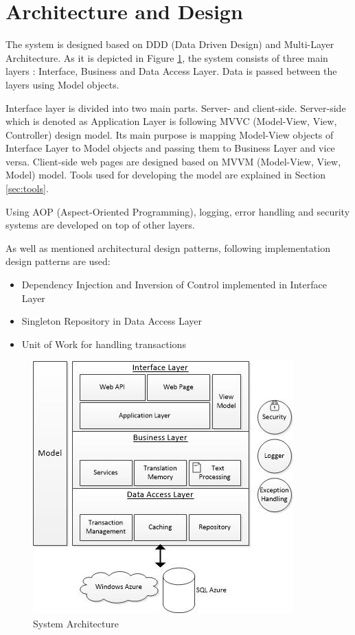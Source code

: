 \section{Architecture and Design}
\label{sec:architecture}
The system is designed based on DDD (Data Driven Design) and Multi-Layer Architecture. As it is depicted in Figure \ref{fig:architecture}, the system consists of three main layers : Interface, Business and Data Access Layer. Data is passed between the layers using Model objects.

Interface layer is divided into two main parts. Server- and client-side. Server-side which is denoted as Application Layer is following MVVC (Model-View, View, Controller) design model. Its main purpose is mapping Model-View objects of Interface Layer to Model objects and passing them to Business Layer and vice versa. Client-side web pages are designed based on MVVM (Model-View, View, Model) model. Tools used for developing the model are explained in Section \ref{sec:tools}.

Using AOP (Aspect-Oriented Programming), logging, error handling and security systems are developed on top of other layers.

As well as mentioned architectural design patterns, following implementation design patterns are used:
\begin{itemize}
	\item Dependency Injection and Inversion of Control implemented in Interface Layer
	\item Singleton Repository in Data Access Layer
	\item Unit of Work for handling transactions
\end{itemize} 

\begin{figure}[h]
\begin{center}
\includegraphics[scale=0.8]{figures/architecture.jpg}
\caption{System Architecture
\label{fig:architecture}}
\end{center}
\end{figure}